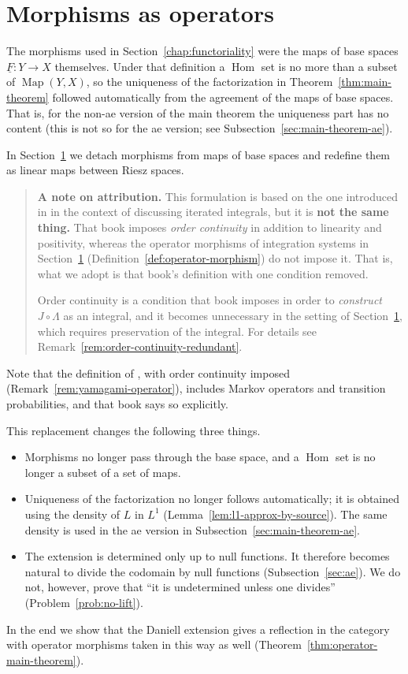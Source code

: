 \section{Morphisms as operators}\label{chap:operator}

The morphisms used in Section~\ref{chap:functoriality} were the maps of base
spaces $\underline{F}:Y\to X$ themselves.
Under that definition a $\operatorname{Hom}$ set is no more than a subset of
$\operatorname{Map}(Y,X)$, so the uniqueness of the factorization in
Theorem~\ref{thm:main-theorem} followed automatically from the agreement of the
maps of base spaces.
That is, for the non-ae version of the main theorem the uniqueness part has no
content (this is not so for the ae version; see
Subsection~\ref{sec:main-theorem-ae}).

In Section~\ref{chap:operator} we detach morphisms from maps of base spaces and
redefine them as linear maps between Riesz spaces.

\begin{quote}
  \textbf{A note on attribution.}
  This formulation is based on the one introduced in \cite{Yamagami} in the
  context of discussing iterated integrals, but it is \textbf{not the same
  thing.}
  That book imposes \emph{order continuity} in addition to linearity and
  positivity, whereas the operator morphisms of integration systems in
  Section~\ref{chap:operator} (Definition~\ref{def:operator-morphism}) do not
  impose it.
  That is, what we adopt is that book's definition with one condition removed.

  Order continuity is a condition that book imposes in order to
  \emph{construct} $J\circ\Lambda$ as an integral, and it becomes unnecessary in
  the setting of Section~\ref{chap:operator}, which requires preservation of the
  integral.
  For details see Remark~\ref{rem:order-continuity-redundant}.
\end{quote}

\noindent
Note that the definition of \cite{Yamagami}, with order continuity imposed
(Remark~\ref{rem:yamagami-operator}), includes Markov operators and transition
probabilities, and that book says so explicitly.

This replacement changes the following three things.

\begin{itemize}
  \item Morphisms no longer pass through the base space, and a
    $\operatorname{Hom}$ set is no longer a subset of a set of maps.
  \item Uniqueness of the factorization no longer follows automatically; it is
    obtained using the density of $L$ in $L^1$
    (Lemma~\ref{lem:l1-approx-by-source}).
    The same density is used in the ae version in
    Subsection~\ref{sec:main-theorem-ae}.
  \item The extension is determined only up to null functions.
    It therefore becomes natural to divide the codomain by null functions
    (Subsection~\ref{sec:ae}).
    We do not, however, prove that ``it is undetermined unless one divides''
    (Problem~\ref{prob:no-lift}).
\end{itemize}

In the end we show that the Daniell extension gives a reflection in the category
with operator morphisms taken in this way as well
(Theorem~\ref{thm:operator-main-theorem}).




